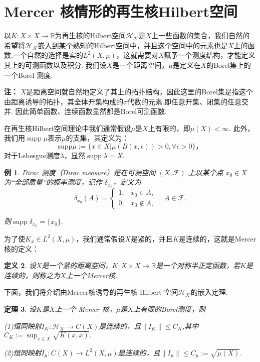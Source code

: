 \documentclass[12pt, a4paper, oneside]{ctexbook}
\newtheorem{theorem}{定理}[section]
\newtheorem{definition}[theorem]{定义}
\newtheorem{example}[theorem]{例}
\begin{document}
\section{Mercer 核情形的再生核Hilbert空间}
以$K:X\times X \to \mathbb{R}$为再生核的Hilbert空间$\mathcal{H_K}$是$X$上一些函数的集合，我们自然的希望将$\mathcal{H_K}$嵌入到某个熟知的Hilbert空间中，并且这个空间中的元素也是$X$上的函数.一个自然的选择是实的$L^2(X,\mu)$，这就需要对$X$赋予一个测度结构，才能定义其上的可测函数以及积分. 我们设$X$是一个距离空间，$\mu$是定义在$X$的Borel集上的一个Borel 测度.

\textbf{注：} $X$是距离空间就自然地定义了其上的拓扑结构，因此这里的Borel集是指这个由距离诱导的拓扑，其全体开集构成的$\sigma$代数的元素.即任意开集、闭集的任意交并. 因此简单函数、连续函数显然都是Borel可测函数.


在再生核Hilbert空间理论中我们通常假设$\mu$是$X$上有限的，即$\mu(X)<\infty$. 此外，我们用$\operatorname{supp} \mu$表示$\mu$的支集，其定义为：
\begin{equation*}
    \mathrm{supp}\mu:=\{x\in X|\mu(B(x,\epsilon))>0,\forall\epsilon>0\}，
\end{equation*}
对于Lebesgue测度$\lambda$，显然$\operatorname{supp}\lambda=X$.
\begin{example}
    Dirac 测度（Dirac measure）是在可测空间 $(X, \mathcal{F})$ 上以某个点 $x_0 \in X$ 为“全部质量”的概率测度，记作 $\delta_{x_0}$，定义为
$$\delta_{x_0}(A) = \begin{cases}
1, & x_0 \in A, \\
0, & x_0 \notin A,
\end{cases} \quad A \in \mathcal{F}.$$

则$\operatorname{supp}\delta_{x_0}=\{x_0\}.$
\end{example}

为了使$K_x\in L^2(X,\mu)$，我们通常假设$X$是紧的，并且$K$是连续的，这就是Mercer核的定义：
\begin{definition}
    设$X$是一个紧的距离空间，$K:X\times X\to\mathbb{R}$是一个对称半正定函数，若$K$是连续的，则称之为$X$上一个Mercer核.
\end{definition}


下面，我们将介绍由Mercer核诱导的再生核 Hilbert 空间$\mathcal{H_K}$的嵌入定理.
\begin{theorem}
    设$K$是$X$上一个 Mercer 核，$\mu$是$X$上有限的Borel测度，则
    
(1)恒同映射$I_K:\mathcal{H_K}\to C(X)$是连续的，且$\|I_K\|\leq C_K$,其中$C_K:=\sup_{x\in X}\sqrt{K(x,x)}.$

(2)恒同映射$I_\mu:C(X)\to L^2(X,\mu)$是连续的，且$\|I_\mu\|\leq C_\mu:=\sqrt{\mu(X)}.$
\end{theorem}
\end{document}
